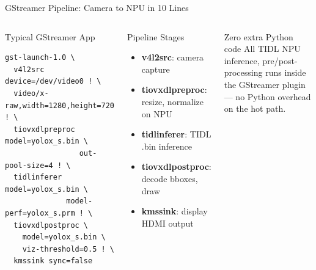 \documentclass[aspectratio=169]{beamer}
\begin{document}
\begin{frame}{GStreamer Pipeline: Camera to NPU in 10 Lines}
\begin{columns}
\small
\begin{block}{Typical GStreamer App}
\footnotesize
\begin{verbatim}
gst-launch-1.0 \
  v4l2src device=/dev/video0 ! \
  video/x-raw,width=1280,height=720 ! \
  tiovxdlpreproc model=yolox_s.bin \
                 out-pool-size=4 ! \
  tidlinferer model=yolox_s.bin \
              model-perf=yolox_s.prm ! \
  tiovxdlpostproc \
    model=yolox_s.bin \
    viz-threshold=0.5 ! \
  kmssink sync=false
\end{verbatim}
\end{block}
\column{0.42\textwidth}
\footnotesize
\begin{block}{Pipeline Stages}
\begin{itemize}
  \item \textbf{v4l2src}: camera capture
  \item \textbf{tiovxdlpreproc}: resize, normalize on NPU
  \item \textbf{tidlinferer}: TIDL .bin inference
  \item \textbf{tiovxdlpostproc}: decode bboxes, draw
  \item \textbf{kmssink}: display HDMI output
\end{itemize}
\end{block}
\begin{alertblock}{Zero extra Python code}
\footnotesize All TIDL NPU inference, pre/post-processing runs inside the GStreamer plugin --- no Python overhead on the hot path.
\end{alertblock}
\end{columns}
\end{frame}
\end{document}
